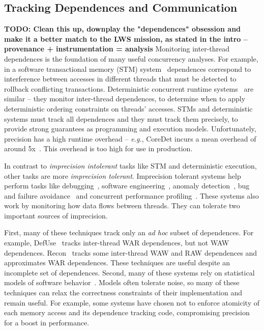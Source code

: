 \documentclass[preprint,9pt]{sigplanconf}
\begin{document}
\subsection{Tracking Dependences and Communication}
\label{sec:background:comm}
{\bf TODO: Clean this up, downplay the "dependences" obsession and make it 
a better match to the LWS mission, as stated in the intro -- provenance + instrumentation = analysis}
Monitoring inter-thread dependences is the foundation of many useful
concurrency analyses.  For example, in a software transactional memory (STM)
system~\cite{stm} dependences correspond to interference between accesses in
different threads that must be detected to rollback conflicting transactions.
Deterministic concurrent runtime systems~\cite{coredet,grace} are similar --
they monitor inter-thread dependences, to determine when to apply
deterministic ordering constraints on threads' accesses.  STMs and
deterministic systems must track all dependences and they must track them
precisely, to provide strong guarantees as programming and execution models.
Unfortunately, precision has a high runtime overhead -- {\em e.g.},
CoreDet incurs a mean overhead of around 5x~\cite{coredet}.  This overhead is
too high for use in production.  


In contrast to {\em imprecision intolerant} tasks like STM and deterministic
execution, other tasks are more {\em imprecision tolerant}.  Imprecision
tolerant systems help perform tasks like
debugging~\cite{defuse,conseq,recon,bugaboo,raceslicing,fasttrack,falcon},
software engineering~\cite{oshajava,oshatr}, anomaly
detection~\cite{avio,dmtracker,cci,daikon}, bug and failure
avoidance~\cite{aviso,cfix} and concurrent performance
profiling~\cite{threadcriticality,schedpredictionmodel}.  These
systems also work by monitoring how data flows between threads.  They can
tolerate two important sources of imprecision.

First, many of these techniques track only an {\em ad hoc} subset of
dependences.  For example, DefUse~\cite{defuse} tracks inter-thread WAR
dependences, but not WAW dependences.  Recon~\cite{recon} tracks some inter-thread WAW and
RAW dependences and approximates WAR dependences.  These techniques are useful
despite an incomplete set of dependences.  Second, many of these systems rely
on statistical models of software
behavior~\cite{avio,cci,defuse,recon,bugaboo,falcon,dmtracker,aviso,threadcriticality,schedpredictionmodel}.
Models often tolerate noise, so many of these techniques can relax the
correctness constraints of their implementation and remain useful.  For
example, some systems have chosen not to enforce atomicity of each memory
access and its dependence tracking code, compromising precision for a boost in
performance.
\end{document}
